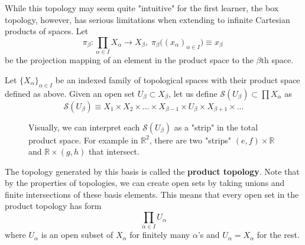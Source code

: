     While this topology may seem quite "intuitive" for the first learner, the box topology, however, has serious limitations when extending to infinite Cartesian products of spaces. Let 
    \begin{equation}
      \pi_\beta: \prod_{\alpha \in I} X_\alpha \longrightarrow X_\beta, \; \pi_\beta \big( (x_\alpha)_{\alpha \in I}\big) \equiv x_\beta\
    \end{equation}
    be the projection mapping of an element in the product space to the $\beta$th space. 

    \begin{theorem}
      Let $\{X_\alpha\}_{\alpha \in I}$ be an indexed family of topological spaces with their product space defined as above. Given an open set $U_\beta \subset X_\beta$, let us define $\mathscr{S} (U_\beta) \subset \prod X_\alpha$ as 
      \begin{equation}
        \mathscr{S}(U_\beta) \equiv X_1 \times X_2 \times ... \times X_{\beta -1} \times U_\beta \times X_{\beta+1} \times ... 
      \end{equation}
      \begin{figure}[H]
        \centering 
        \caption{Visually, we can interpret each $\mathscr{S} (U_\beta)$ as a "strip" in the total product space. For example in $\mathbb{R}^2$, there are two "strips" $(e, f) \times \mathbb{R}$ and $\mathbb{R} \times (g, h)$ that intersect. }
        \label{fig:product_topology}
      \end{figure}
      The topology generated by this basis is called the \textbf{product topology}. Note that by the properties of topologies, we can create open sets by taking unions and finite intersections of these basis elements. This means that every open set in the product topology has form
      \begin{equation}
        \prod_{\alpha \in I} U_\alpha
      \end{equation}
      where $U_\alpha$ is an open subset of $X_\alpha$ for finitely many $\alpha$'s and $U_\alpha = X_\alpha$ for the rest. 
    \end{theorem}


